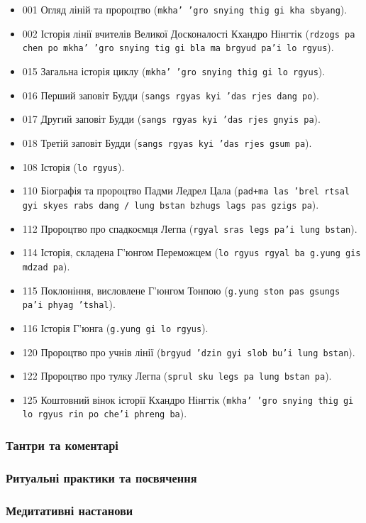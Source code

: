 \documentclass{article}
\begin{document}
\begin{itemize}
\item 001 Огляд ліній та пророцтво (\texttt{mkha' 'gro snying thig gi kha sbyang}).
\item 002 Історія лінії вчителів Великої Досконалості Кхандро Нінгтік (\texttt{rdzogs pa chen po mkha' 'gro snying tig gi bla ma brgyud pa'i lo rgyus}).
\item 015 Загальна історія циклу (\texttt{mkha' 'gro snying thig gi lo rgyus}).
\item 016 Перший заповіт Будди (\texttt{sangs rgyas kyi 'das rjes dang po}).
\item 017 Другий заповіт Будди (\texttt{sangs rgyas kyi 'das rjes gnyis pa}).
\item 018 Третій заповіт Будди (\texttt{sangs rgyas kyi 'das rjes gsum pa}).
\item 108 Історія (\texttt{lo rgyus}).
\item 110 Біографія та пророцтво Падми Ледрел Цала (\texttt{pad+ma las 'brel rtsal gyi skyes rabs dang / lung bstan bzhugs lags pas gzigs pa}).
\item 112 Пророцтво про спадкоємця Легпа (\texttt{rgyal sras legs pa'i lung bstan}).
\item 114 Історія, складена Г’юнгом Переможцем (\texttt{lo rgyus rgyal ba g.yung gis mdzad pa}).
\item 115 Поклоніння, висловлене Г’юнгом Тонпою (\texttt{g.yung ston pas gsungs pa'i phyag 'tshal}).
\item 116 Історія Г’юнга (\texttt{g.yung gi lo rgyus}).
\item 120 Пророцтво про учнів лінії (\texttt{brgyud 'dzin gyi slob bu'i lung bstan}).
\item 122 Пророцтво про тулку Легпа (\texttt{sprul sku legs pa lung bstan pa}).
\item 125 Коштовний вінок історії Кхандро Нінгтік (\texttt{mkha' 'gro snying thig gi lo rgyus rin po che'i phreng ba}).
\end{itemize}

\subsubsection{Тантри та коментарі}
\subsubsection{Ритуальні практики та посвячення}
\subsubsection{Медитативні настанови}
\end{document}
